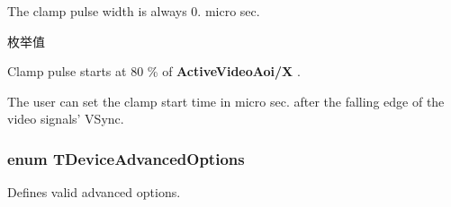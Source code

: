 The clamp pulse width is always 0. micro sec. \begin{Desc}
\item[枚举值]\par
\begin{description}
\item[{\em 
\hypertarget{group___device_specific_interface_ggad42717c53ece3c90f468265fd0267ad2a44fbd875ec78a42a2afd92455879587f}{ecm\+Auto}\label{group___device_specific_interface_ggad42717c53ece3c90f468265fd0267ad2a44fbd875ec78a42a2afd92455879587f}
}]Clamp pulse starts at 80 \% of {\bfseries Active\+Video\+Aoi/\+X} . \item[{\em 
\hypertarget{group___device_specific_interface_ggad42717c53ece3c90f468265fd0267ad2a2c14ee7626cd836d276a33655442c0b8}{ecm\+User}\label{group___device_specific_interface_ggad42717c53ece3c90f468265fd0267ad2a2c14ee7626cd836d276a33655442c0b8}
}]The user can set the clamp start time in micro sec. after the falling edge of the video signals' V\+Sync. \end{description}
\end{Desc}
\hypertarget{group___device_specific_interface_gad8cdd91ea42682e1055b0fb168f2ea58}{
\subsubsection[{T\+Device\+Advanced\+Options}]{\setlength{\rightskip}{0pt plus 5cm}enum {\bf T\+Device\+Advanced\+Options}}}\label{group___device_specific_interface_gad8cdd91ea42682e1055b0fb168f2ea58}


Defines valid advanced options. 

